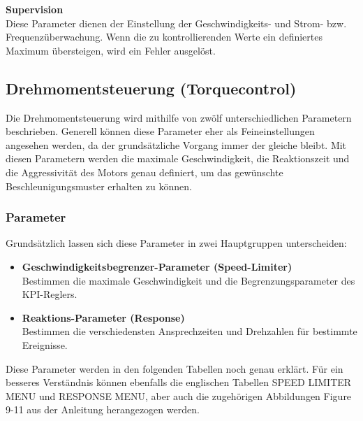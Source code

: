 \textbf{Supervision}\\[1mm]
Diese Parameter dienen der Einstellung der Geschwindigkeits- und Strom- bzw. Frequenzüberwachung. Wenn die zu kontrollierenden Werte ein definiertes Maximum übersteigen, wird ein Fehler ausgelöst.


\newpage

\subsection{Drehmomentsteuerung (Torquecontrol)}
\label{Torquecontrol}
Die Drehmomentsteuerung wird mithilfe von zwölf unterschiedlichen Parametern beschrieben. Generell können diese Parameter eher als Feineinstellungen angesehen werden, da der grundsätzliche Vorgang immer der gleiche bleibt. Mit diesen Parametern werden die maximale Geschwindigkeit, die Reaktionszeit und die Aggressivität des Motors genau definiert, um das gewünschte Beschleunigungsmuster erhalten zu können.

\vspace{1mm}
 
\subsubsection{Parameter}
Grundsätzlich lassen sich diese Parameter in zwei Hauptgruppen unterscheiden:
\\[5mm]
\begin{itemize}
	\item \textbf{Geschwindigkeitsbegrenzer-Parameter (Speed-Limiter)}
	\\ \medskip Bestimmen die maximale Geschwindigkeit und die Begrenzungsparameter des KPI-Reglers.
	\medskip
	\item \textbf{Reaktions-Parameter (Response)}
	\\ \medskip Bestimmen die verschiedensten Ansprechzeiten und Drehzahlen für bestimmte Ereignisse.
\end{itemize}

\vspace{5mm}

Diese Parameter werden in den folgenden Tabellen noch genau erklärt. Für ein besseres Verständnis können ebenfalls die englischen Tabellen \glqq SPEED LIMITER MENU\grqq{} und \glqq RESPONSE MENU\grqq{}, aber auch die zugehörigen Abbildungen \glqq Figure 9-11\grqq{} aus der Anleitung herangezogen werden.




